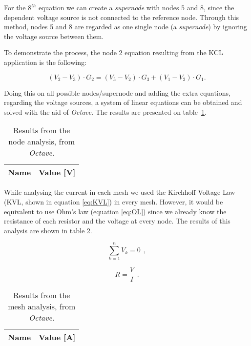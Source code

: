For the $8^{th}$ equation we can create a \textit{supernode} with nodes 5 and 8, since the dependent voltage source is not connected to the reference node. Through this method, nodes 5 and 8 are regarded as one single node (a \textit{supernode}) by ignoring the voltage source between them.

To demonstrate the process, the node 2 equation resulting from the KCL application is the following:

\begin{equation}
    (V_2-V_3)\cdot G_2=(V_5-V_2)\cdot G_3+(V_1-V_2)\cdot G_1.
    \label{n2}
\end{equation}

Doing this on all possible nodes/supernode and adding the extra equations, regarding the voltage sources, a system of linear equations can be obtained and solved with the aid of \textit{Octave}. The results are presented on table~\ref{tab:Volts}.

\begin{table}[H]
  \centering
  \begin{tabular}{|l|r|}
    \hline    
    {\bf Name} & {\bf Value [V]} \\ \hline
    
  \end{tabular}
  \caption{Results from the node analysis, from \textit{Octave}.}
  \label{tab:Volts}
\end{table}

While analysing the current in each mesh we used the Kirchhoff Voltage Law (KVL, shown in equation \ref{eq:KVL}) in every mesh. However, it would be equivalent to use Ohm's law (equation \ref{eq:OL}) since we already know the resistance of each resistor and the voltage at every node. The results of this analysis are shown in table \ref{tab:currents}.

\begin{equation}
    \sum_{k=1}^{n} V_k = 0 \hspace{5pt},
    \label{eq:KVL}
\end{equation}

\begin{equation}
    R=\frac{V}{I} \hspace{5pt}.
    \label{eq:OL}
\end{equation}

\begin{table}[H]
  \centering
  \begin{tabular}{|l|r|}
    \hline    
    {\bf Name} & {\bf Value [A]} \\ \hline
    
  \end{tabular}
  \caption{Results from the mesh analysis, from \textit{Octave}.}
  \label{tab:currents}
\end{table}

